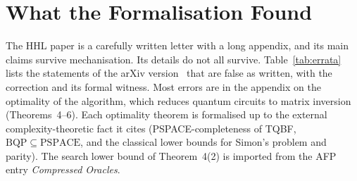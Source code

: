 \documentclass[runningheads]{llncs}
\begin{document}
\section{What the Formalisation Found}\label{sec:errata}

The HHL paper is a carefully written letter with a long appendix, and its main claims survive
mechanisation. Its details do not all survive. Table~\ref{tab:errata} lists the statements of the
arXiv version~\cite{hhl2008arxiv} that are false as written, with the correction and its formal witness.
Most errors are in the appendix on the optimality of the algorithm, which reduces quantum circuits to
matrix inversion (Theorems~4--6). Each optimality theorem is formalised up to the external
complexity-theoretic fact it cites (PSPACE-completeness of TQBF, $\mathrm{BQP}\subseteq\mathrm{PSPACE}$,
and the classical lower bounds for Simon's problem and parity). The search lower bound of Theorem~4(2)
is imported from the AFP entry \emph{Compressed Oracles}.
\end{document}
